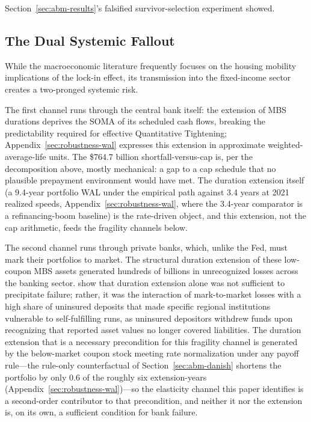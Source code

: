 \documentclass[12pt]{article}
\begin{document}
Section~\ref{sec:abm-results}'s falsified survivor-selection experiment showed.

\subsection{The Dual Systemic Fallout}\label{sec:discussion-fallout}

While the macroeconomic literature frequently focuses on the housing mobility implications of the lock-in effect, its transmission into the fixed-income sector creates a two-pronged systemic risk.

The first channel runs through the central bank itself: the extension of MBS durations deprives the SOMA of its scheduled cash flows, breaking the predictability required for effective Quantitative Tightening; Appendix~\ref{sec:robustness-wal} expresses this extension in approximate weighted-average-life units. The \$764.7 billion shortfall-versus-cap is, per the decomposition above, mostly mechanical: a gap to a cap schedule that no plausible prepayment environment would have met. The duration extension itself (a 9.4-year portfolio WAL under the empirical path against 3.4 years at 2021 realized speeds, Appendix~\ref{sec:robustness-wal}, where the 3.4-year comparator is a refinancing-boom baseline) is the rate-driven object, and this extension, not the cap arithmetic, feeds the fragility channels below.

The second channel runs through private banks, which, unlike the Fed, must mark their portfolios to market. The structural duration extension of these low-coupon MBS assets generated hundreds of billions in unrecognized losses across the banking sector. \citet{jiang2023} show that duration extension alone was not sufficient to precipitate failure; rather, it was the interaction of mark-to-market losses with a high share of uninsured deposits that made specific regional institutions vulnerable to self-fulfilling runs, as uninsured depositors withdrew funds upon recognizing that reported asset values no longer covered liabilities. The duration extension that is a necessary precondition for this fragility channel is generated by the below-market coupon stock meeting rate normalization under any payoff rule---the rule-only counterfactual of Section~\ref{sec:abm-danish} shortens the portfolio by only 0.6 of the roughly six extension-years (Appendix~\ref{sec:robustness-wal})---so the elasticity channel this paper identifies is a second-order contributor to that precondition, and neither it nor the extension is, on its own, a sufficient condition for bank failure.
\end{document}
